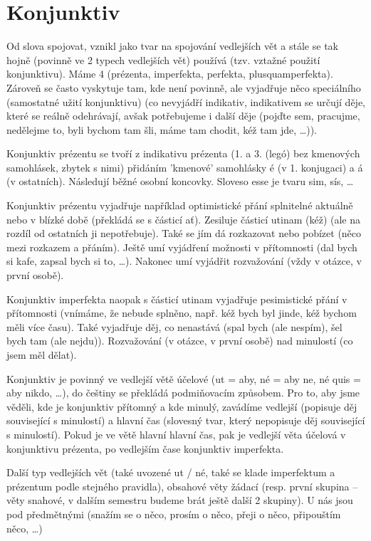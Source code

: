 \documentclass[12pt]{article}					%
\begin{document}


\section{Konjunktiv}
Od slova spojovat, vznikl jako tvar na spojování vedlejších vět a stále se tak hojně (povinně ve 2 typech vedlejších vět) používá (tzv. vztažné použití konjunktivu). Máme 4 (prézenta, imperfekta, perfekta, plusquamperfekta). Zároveň se často vyskytuje tam, kde není povinně, ale vyjadřuje něco speciálního (samostatné užití konjunktivu) (co nevyjádří indikativ, indikativem se určují děje, které se reálně odehrávají, avšak potřebujeme i další děje (pojďte sem, pracujme, nedělejme to, byli bychom tam šli, máme tam chodit, kéž tam jde, …)).

Konjunktiv prézentu se tvoří z indikativu prézenta (1. a 3. (legó) bez kmenových samohlásek, zbytek s nimi) přidáním 'kmenové' samohlásky é (v 1. konjugaci) a á (v ostatních). Následují běžné osobní koncovky. Sloveso esse je tvaru sim, sís, …

Konjunktiv prézentu vyjadřuje například optimistické přání splnitelné aktuálně nebo v blízké době (překládá se s částicí ať). Zesiluje částicí utinam (kéž) (ale na rozdíl od ostatních ji nepotřebuje). Také se jím dá rozkazovat nebo pobízet (něco mezi rozkazem a přáním). Ještě umí vyjádření možnosti v přítomnosti (dal bych si kafe, zapsal bych si to, …). Nakonec umí vyjádřit rozvažování (vždy v otázce, v první osobě).

Konjunktiv imperfekta naopak s částicí utinam vyjadřuje pesimistické přání v přítomnosti (vnímáme, že nebude splněno, např. kéž bych byl jinde, kéž bychom měli více času). Také vyjadřuje děj, co nenastává (spal bych (ale nespím), šel bych tam (ale nejdu)). Rozvažování (v otázce, v první osobě) nad minulostí (co jsem měl dělat).

Konjunktiv je povinný ve vedlejší větě účelové (ut = aby, né = aby ne, né quis = aby nikdo, …), do češtiny se překládá podmiňovacím způsobem. Pro to, aby jsme věděli, kde je konjunktiv přítomný a kde minulý, zavádíme vedlejší (popisuje děj související s minulostí) a hlavní čas (slovesný tvar, který nepopisuje děj související s minulostí). Pokud je ve větě hlavní hlavní čas, pak je vedlejší věta účelová v konjunktivu prézenta, po vedlejším čase konjunktiv imperfekta.

Další typ vedlejších vět (také uvozené ut / né, také se klade imperfektum a prézentum podle stejného pravidla), obsahové věty žádací (resp. první skupina -- věty snahové, v dalším semestru budeme brát ještě další 2 skupiny). U nás jsou pod předmětnými (snažím se o něco, prosím o něco, přeji o něco, připouštím něco, …)
\end{document}
